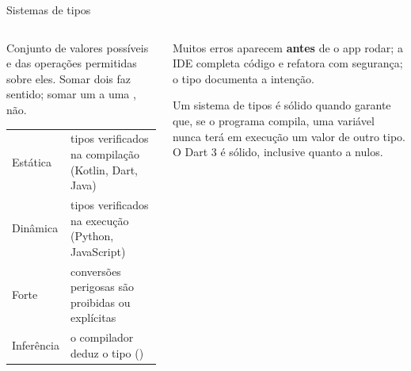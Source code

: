 \begin{frame}{Sistemas de tipos}
  \begin{columns}[T]
    \begin{column}{0.5\textwidth}
      \begin{definicao}[Tipo]
        Conjunto de valores possíveis e das operações permitidas sobre eles. Somar dois  faz sentido; somar um  a uma , não.
      \end{definicao}
      \scriptsize
      \begin{tabularx}{\linewidth}{@{}l L@{}}
        \toprule
         &  \\
        \midrule
        Estática & tipos verificados na compilação (Kotlin, Dart, Java) \\
        Dinâmica & tipos verificados na execução (Python, JavaScript) \\
        Forte & conversões perigosas são proibidas ou explícitas \\
        Inferência & o compilador deduz o tipo () \\
        \bottomrule
      \end{tabularx}
    \end{column}
    \begin{column}{0.48\textwidth}
      \begin{conceito}
        Muitos erros aparecem \textbf{antes} de o app rodar; a IDE completa código e refatora com segurança; o tipo documenta a intenção.
      \end{conceito}
      \begin{pordentro}
        Um sistema de tipos é sólido quando garante que, se o programa compila, uma variável nunca terá em execução um valor de outro tipo. O Dart 3 é sólido, inclusive quanto a nulos.
      \end{pordentro}
    \end{column}
  \end{columns}
\end{frame}

